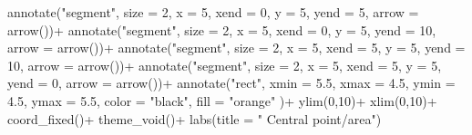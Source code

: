 \documentclass[
  letterpaper,
  DIV=11,
  numbers=noendperiod]{scrreprt}
\newenvironment{Shaded}{\begin{snugshade}}{\end{snugshade}}
\newcommand{\AttributeTok}[1]{\textcolor[rgb]{0.40,0.45,0.13}{#1}}
\newcommand{\DecValTok}[1]{\textcolor[rgb]{0.68,0.00,0.00}{#1}}
\newcommand{\FloatTok}[1]{\textcolor[rgb]{0.68,0.00,0.00}{#1}}
\newcommand{\FunctionTok}[1]{\textcolor[rgb]{0.28,0.35,0.67}{#1}}
\newcommand{\NormalTok}[1]{\textcolor[rgb]{0.00,0.23,0.31}{#1}}
\newcommand{\SpecialCharTok}[1]{\textcolor[rgb]{0.37,0.37,0.37}{#1}}
\newcommand{\StringTok}[1]{\textcolor[rgb]{0.13,0.47,0.30}{#1}}
\begin{document}
\begin{Shaded}
\begin{Highlighting}[]
  \FunctionTok{annotate}\NormalTok{(}\StringTok{"segment"}\NormalTok{, }\AttributeTok{size =} \DecValTok{2}\NormalTok{, }\AttributeTok{x =} \DecValTok{5}\NormalTok{, }\AttributeTok{xend =} \DecValTok{0}\NormalTok{, }\AttributeTok{y =} \DecValTok{5}\NormalTok{, }\AttributeTok{yend =} \DecValTok{5}\NormalTok{, }\AttributeTok{arrow =} \FunctionTok{arrow}\NormalTok{())}\SpecialCharTok{+}
  \FunctionTok{annotate}\NormalTok{(}\StringTok{"segment"}\NormalTok{, }\AttributeTok{size =} \DecValTok{2}\NormalTok{, }\AttributeTok{x =} \DecValTok{5}\NormalTok{, }\AttributeTok{xend =} \DecValTok{0}\NormalTok{, }\AttributeTok{y =} \DecValTok{5}\NormalTok{, }\AttributeTok{yend =} \DecValTok{10}\NormalTok{, }\AttributeTok{arrow =} \FunctionTok{arrow}\NormalTok{())}\SpecialCharTok{+}
  \FunctionTok{annotate}\NormalTok{(}\StringTok{"segment"}\NormalTok{, }\AttributeTok{size =} \DecValTok{2}\NormalTok{, }\AttributeTok{x =} \DecValTok{5}\NormalTok{, }\AttributeTok{xend =} \DecValTok{5}\NormalTok{, }\AttributeTok{y =} \DecValTok{5}\NormalTok{, }\AttributeTok{yend =} \DecValTok{10}\NormalTok{, }\AttributeTok{arrow =} \FunctionTok{arrow}\NormalTok{())}\SpecialCharTok{+}
  \FunctionTok{annotate}\NormalTok{(}\StringTok{"segment"}\NormalTok{, }\AttributeTok{size =} \DecValTok{2}\NormalTok{, }\AttributeTok{x =} \DecValTok{5}\NormalTok{, }\AttributeTok{xend =} \DecValTok{5}\NormalTok{, }\AttributeTok{y =} \DecValTok{5}\NormalTok{, }\AttributeTok{yend =} \DecValTok{0}\NormalTok{, }\AttributeTok{arrow =} \FunctionTok{arrow}\NormalTok{())}\SpecialCharTok{+}
   \FunctionTok{annotate}\NormalTok{(}\StringTok{"rect"}\NormalTok{, }\AttributeTok{xmin =} \FloatTok{5.5}\NormalTok{, }\AttributeTok{xmax =} \FloatTok{4.5}\NormalTok{, }\AttributeTok{ymin =} \FloatTok{4.5}\NormalTok{, }\AttributeTok{ymax =} \FloatTok{5.5}\NormalTok{, }\AttributeTok{color =} \StringTok{"black"}\NormalTok{, }\AttributeTok{fill =} \StringTok{"orange"}\NormalTok{ )}\SpecialCharTok{+}
  \FunctionTok{ylim}\NormalTok{(}\DecValTok{0}\NormalTok{,}\DecValTok{10}\NormalTok{)}\SpecialCharTok{+}
  \FunctionTok{xlim}\NormalTok{(}\DecValTok{0}\NormalTok{,}\DecValTok{10}\NormalTok{)}\SpecialCharTok{+}
  \FunctionTok{coord\_fixed}\NormalTok{()}\SpecialCharTok{+}
  \FunctionTok{theme\_void}\NormalTok{()}\SpecialCharTok{+}
  \FunctionTok{labs}\NormalTok{(}\AttributeTok{title =} \StringTok{"    Central point/area"}\NormalTok{)}


\end{Highlighting}
\end{Shaded}
\end{document}
